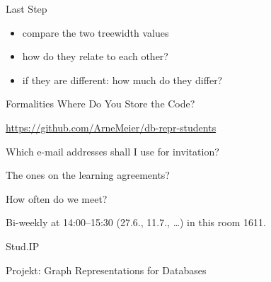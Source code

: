 \documentclass[]{beamer}
\begin{document}
\begin{frame}{Last Step}
\begin{itemize}
	\item compare the two treewidth values
	\item how do they relate to each other?
	\item if they are different: how much do they differ?
\end{itemize}
\end{frame}



\begin{frame}{Formalities}
\alert{Where Do You Store the Code?}

\url{https://github.com/ArneMeier/db-repr-students}\bigskip

\alert{Which e-mail addresses shall I use for invitation?}

The ones on the learning agreements?\bigskip

\alert{How often do we meet?} 

Bi-weekly at 14:00--15:30 (27.6., 11.7., \dots) in this room 1611.\bigskip

\alert{Stud.IP}

Projekt: Graph Representations for Databases
\end{frame}
\end{document}
